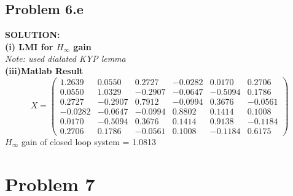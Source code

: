 \documentclass[10pt,a4paper]{article}
\begin{document}
\subsection{Problem 6.e}
\begin{tcolorbox}
\textbf{SOLUTION:}\\
\textbf{(i) LMI for $H_\infty$ gain }\\
\textit{Note: used dialated KYP lemma}\\

\textbf{(iii)Matlab Result}
$$X=\left(\begin{array}{cccccc} 1.2639 & 0.0550 & 0.2727 & -0.0282 & 0.0170 & 0.2706\\ 0.0550 & 1.0329 & -0.2907 & -0.0647 & -0.5094 & 0.1786\\ 0.2727 & -0.2907 & 0.7912 & -0.0994 & 0.3676 & -0.0561\\ -0.0282 & -0.0647 & -0.0994 & 0.8802 & 0.1414 & 0.1008\\ 0.0170 & -0.5094 & 0.3676 & 0.1414 & 0.9138 & -0.1184\\ 0.2706 & 0.1786 & -0.0561 & 0.1008 & -0.1184 & 0.6175 \end{array}\right)
$$
$H_\infty$ gain of closed loop system = 1.0813

\end{tcolorbox}


\section{Problem 7}
\end{document}
